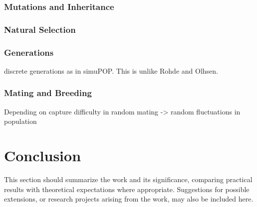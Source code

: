 \documentclass{l4proj}
\begin{document}
\subsection{Mutations and Inheritance}

\subsection{Natural Selection}

\subsection{Generations}
discrete generations as in simuPOP. This is unlike Rohde and Olhsen.

\subsection{Mating and Breeding}
Depending on 
capture difficulty in random mating -> random fluctuations in population 

\chapter{Conclusion}\label{conclusion}
This section should summarize the work and its significance, comparing practical results with theoretical expectations where appropriate. Suggestions for possible extensions, or research projects arising from the work, may also be included here.

\printglossaries
\printbibliography[heading=bibintoc]
\end{document}
